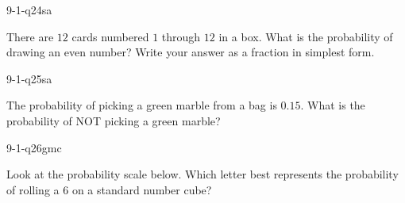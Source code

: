\begin{practiceQuestion}{9-1-q24}{sa}
\begin{questionText}
There are $12$ cards numbered $1$ through $12$ in a box. What is the probability of drawing an even number? Write your answer as a fraction in simplest form.
\end{questionText}
\end{practiceQuestion}

\begin{practiceQuestion}{9-1-q25}{sa}
\begin{questionText}
The probability of picking a green marble from a bag is $0.15$. What is the probability of NOT picking a green marble?
\end{questionText}
\end{practiceQuestion}


\begin{practiceQuestion}{9-1-q26}{gmc}
\begin{questionText}
Look at the probability scale below. Which letter best represents the probability of rolling a $6$ on a standard number cube?

\begin{center}
\end{center}
\end{questionText}
\end{practiceQuestion}


